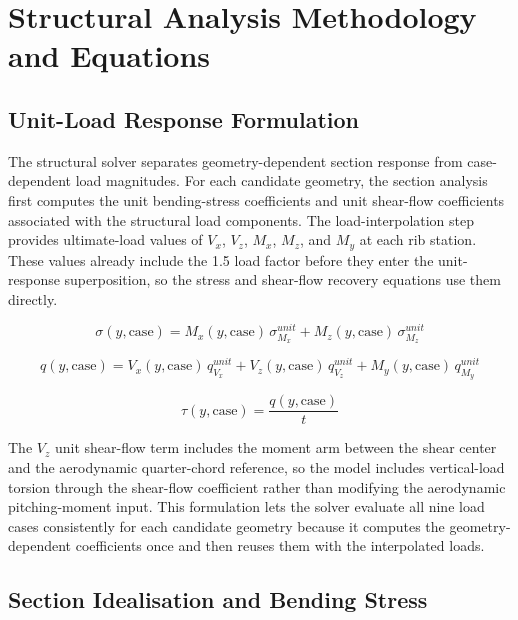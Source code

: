 \documentclass[11pt]{article}
\begin{document}
\section{Structural Analysis Methodology and Equations}

\subsection{Unit-Load Response Formulation}

The structural solver separates geometry-dependent section response from case-dependent load magnitudes. For each candidate geometry, the section analysis first computes the unit bending-stress coefficients and unit shear-flow coefficients associated with the structural load components. The load-interpolation step provides ultimate-load values of $V_x$, $V_z$, $M_x$, $M_z$, and $M_y$ at each rib station. These values already include the 1.5 load factor before they enter the unit-response superposition, so the stress and shear-flow recovery equations use them directly.

\begin{equation}
  \sigma(y,\mathrm{case}) =
  M_x(y,\mathrm{case})\,\sigma_{M_x}^{unit}
  +
  M_z(y,\mathrm{case})\,\sigma_{M_z}^{unit}
\end{equation}

\begin{equation}
  q(y,\mathrm{case}) =
  V_x(y,\mathrm{case})\,q_{V_x}^{unit}
  +
  V_z(y,\mathrm{case})\,q_{V_z}^{unit}
  +
  M_y(y,\mathrm{case})\,q_{M_y}^{unit}
\end{equation}

\begin{equation}
  \tau(y,\mathrm{case}) = \frac{q(y,\mathrm{case})}{t}
\end{equation}

The $V_z$ unit shear-flow term includes the moment arm between the shear center and the aerodynamic quarter-chord reference, so the model includes vertical-load torsion through the shear-flow coefficient rather than modifying the aerodynamic pitching-moment input. This formulation lets the solver evaluate all nine load cases consistently for each candidate geometry because it computes the geometry-dependent coefficients once and then reuses them with the interpolated loads.

\subsection{Section Idealisation and Bending Stress}
\end{document}
